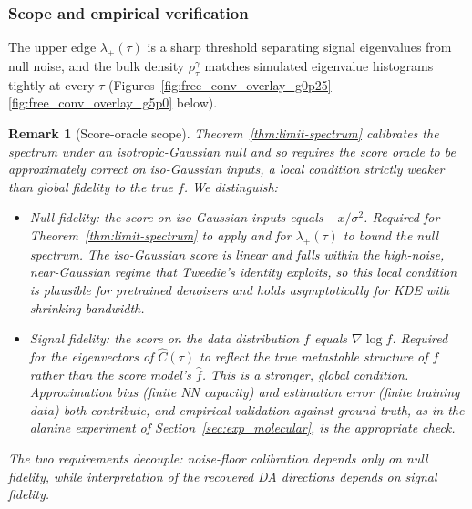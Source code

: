 \documentclass{article}
\newtheorem{remark}{Remark}
\begin{document}
\subsubsection{Scope and empirical verification}
\label{app:scope}

The upper edge $\lambda_+(\tau)$ is a sharp threshold separating signal eigenvalues from null noise, and the bulk density $\rho_\tau^\gamma$ matches simulated eigenvalue histograms tightly at every $\tau$ (Figures~\ref{fig:free_conv_overlay_g0p25}--\ref{fig:free_conv_overlay_g5p0} below).

\begin{remark}[Score-oracle scope]
\label{rem:score_oracle}
Theorem~\ref{thm:limit-spectrum} calibrates the spectrum under an
isotropic-Gaussian null and so requires the score oracle to be
approximately correct \emph{on iso-Gaussian inputs}, a local
condition strictly weaker than global fidelity to the true $f$. We
distinguish:
\begin{itemize}[leftmargin=*,nosep]
\item \emph{Null fidelity:} the score on iso-Gaussian inputs equals
$-x/\sigma^2$. Required for Theorem~\ref{thm:limit-spectrum} to apply
and for $\lambda_+(\tau)$ to bound the null spectrum. The iso-Gaussian
score is linear and falls within the high-noise, near-Gaussian regime
that Tweedie's identity exploits, so this local condition is
plausible for pretrained denoisers and holds asymptotically for KDE
with shrinking bandwidth.
\item \emph{Signal fidelity:} the score on the data distribution
$f$ equals $\nabla \log f$. Required for the eigenvectors of
$\hat C(\tau)$ to reflect the true metastable structure of $f$
rather than the score model's $\hat f$. This is a stronger,
global condition. Approximation bias (finite NN capacity) and
estimation error (finite training data) both contribute, and
empirical validation against ground truth, as in the alanine
experiment of Section~\ref{sec:exp_molecular}, is the appropriate
check.
\end{itemize}
The two requirements decouple: noise-floor calibration depends only
on null fidelity, while interpretation of the recovered DA directions
depends on signal fidelity.
\end{remark}
\end{document}
